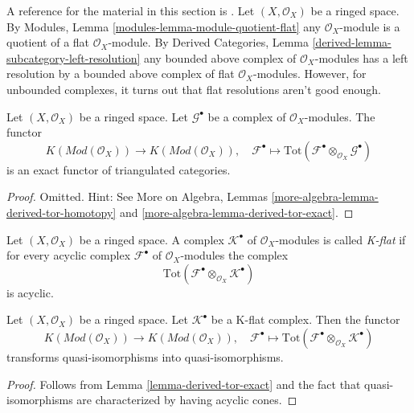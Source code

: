 \noindent
A reference for the material in this section is \cite{Spaltenstein}.
Let $(X, \mathcal{O}_X)$ be a ringed space. By
Modules, Lemma \ref{modules-lemma-module-quotient-flat}
any $\mathcal{O}_X$-module is a quotient of a flat $\mathcal{O}_X$-module.
By
Derived Categories, Lemma \ref{derived-lemma-subcategory-left-resolution}
any bounded above complex of $\mathcal{O}_X$-modules has a left
resolution by a bounded above complex of flat $\mathcal{O}_X$-modules.
However, for unbounded complexes, it turns out that flat resolutions
aren't good enough.

\begin{lemma}
\label{lemma-derived-tor-exact}
Let $(X, \mathcal{O}_X)$ be a ringed space.
Let $\mathcal{G}^\bullet$ be a complex of $\mathcal{O}_X$-modules.
The functor
$$
K(\textit{Mod}(\mathcal{O}_X))
\longrightarrow
K(\textit{Mod}(\mathcal{O}_X)),
\quad
\mathcal{F}^\bullet \longmapsto
\text{Tot}(\mathcal{F}^\bullet \otimes_{\mathcal{O}_X} \mathcal{G}^\bullet)
$$
is an exact functor of triangulated categories.
\end{lemma}

\begin{proof}
Omitted. Hint: See
More on Algebra, Lemmas \ref{more-algebra-lemma-derived-tor-homotopy} and
\ref{more-algebra-lemma-derived-tor-exact}.
\end{proof}

\begin{definition}
\label{definition-K-flat}
Let $(X, \mathcal{O}_X)$ be a ringed space.
A complex $\mathcal{K}^\bullet$ of $\mathcal{O}_X$-modules is
called {\it K-flat} if for every acyclic complex $\mathcal{F}^\bullet$
of $\mathcal{O}_X$-modules the complex
$$
\text{Tot}(\mathcal{F}^\bullet \otimes_{\mathcal{O}_X} \mathcal{K}^\bullet)
$$
is acyclic.
\end{definition}

\begin{lemma}
\label{lemma-K-flat-quasi-isomorphism}
Let $(X, \mathcal{O}_X)$ be a ringed space.
Let $\mathcal{K}^\bullet$ be a K-flat complex.
Then the functor
$$
K(\textit{Mod}(\mathcal{O}_X))
\longrightarrow
K(\textit{Mod}(\mathcal{O}_X)), \quad
\mathcal{F}^\bullet
\longmapsto
\text{Tot}(\mathcal{F}^\bullet \otimes_{\mathcal{O}_X} \mathcal{K}^\bullet)
$$
transforms quasi-isomorphisms into quasi-isomorphisms.
\end{lemma}

\begin{proof}
Follows from
Lemma \ref{lemma-derived-tor-exact}
and the fact that quasi-isomorphisms are characterized by having
acyclic cones.
\end{proof}

